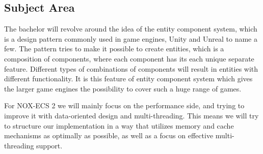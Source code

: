 \subsection{Subject Area}
The bachelor will revolve around the idea of the entity component system, which is a design pattern commonly used in game engines, Unity and Unreal to name a few. 
The pattern tries to make it possible to create entities, which is a composition of components, where each component has its each unique separate feature. 
Different types of combinations of components will result in entities with different functionality. 
It is this feature of entity component system which gives the larger game engines the possibility to cover such a huge range of games.

For NOX-ECS 2 we will mainly focus on the performance side, and trying to improve it with data-oriented design and multi-threading. 
This means we will try to structure our implementation in a way that utilizes memory and cache mechanisms as optimally as possible, as well as a focus on effective multi-threading support.